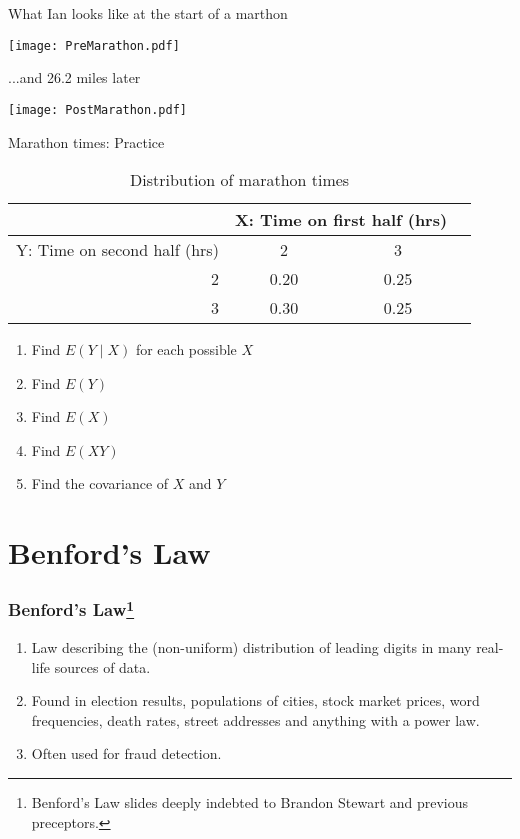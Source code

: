\documentclass{beamer}
\begin{document}
\begin{frame}{What Ian looks like at the start of a marthon}
\begin{center}
\texttt{[image: PreMarathon.pdf]}
\end{center}
\end{frame}

\begin{frame}{...and 26.2 miles later}
\begin{center}
\texttt{[image: PostMarathon.pdf]}
\end{center}
\end{frame}

\begin{frame}{Marathon times: Practice}
\begin{table}[ht]
\centering
\begin{tabular}{rccc}
 & \multicolumn{2}{c}{X: Time on first half (hrs)} \\
  \hline
Y: Time on second half (hrs) & 2 & 3 \\ 
  \hline
2 & 0.20 & 0.25 \\ 
  3 & 0.30 & 0.25 \\ 
   \hline
   \hline
\end{tabular}
\caption{Distribution of marathon times} 
\end{table}
\begin{enumerate}
\item Find $E(Y\mid X)$ for each possible $X$
\item Find $E(Y)$
\item Find $E(X)$
\item Find $E(XY)$
\item Find the covariance of $X$ and $Y$
\end{enumerate}
\end{frame}



\section{Benford's Law}
\begin{frame}\frametitle{Benford's Law\footnote{Benford's Law slides deeply indebted to Brandon Stewart and previous preceptors.}}
\begin{enumerate}
\item Law describing the (non-uniform) distribution of leading digits in many real-life sources of data.
\item Found in election results, populations of cities, stock market prices, word frequencies, death rates, street addresses and anything with a power law.
\item Often used for fraud detection.
\end{enumerate}
\end{frame}
\end{document}
